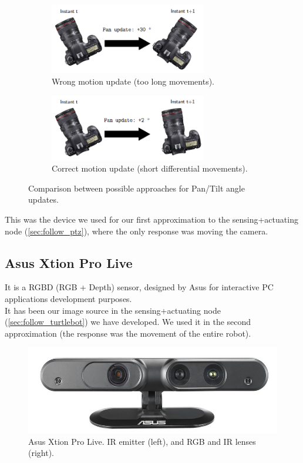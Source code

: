 		\begin{figure}[h]
			\centering
			\begin{subfigure}[h]{0.4\linewidth}
				\centering
				\includegraphics[width=2.7in]{images/ptz_wrong_movement}
				\caption{Wrong motion update (too long movements).}
				\label{fig:3_ptz_wrong}
			\end{subfigure}
			\qquad
			\begin{subfigure}[h]{0.4\linewidth}
				\centering
				\includegraphics[width=2.7in]{images/ptz_correct_movement}
				\caption{Correct motion update (short differential movements).}
				\label{fig:3_ptz_right}
			\end{subfigure}
			\caption{Comparison between possible approaches for Pan/Tilt angle updates.}
			\label{fig:3_ptz_movements}
		\end{figure}
		

		This was the device we used for our first approximation to the sensing+actuating node (\autoref{sec:follow_ptz}), where the only response was moving the camera.\\

	\subsection{Asus Xtion Pro Live}
		It is a RGBD (RGB + Depth) sensor, designed by Asus for interactive PC applications development purposes. \\

		It has been our image source in the sensing+actuating node (\autoref{sec:follow_turtlebot}) we have developed. We used it in the second approximation (the response was the movement of the entire robot).

		\begin{figure}[h]
			\centering
			\includegraphics[width=0.4\linewidth]{images/xtion}
			\caption{Asus Xtion Pro Live. IR emitter (left), and RGB and IR lenses (right).}
			\label{fig:3_xtion}
		\end{figure}

